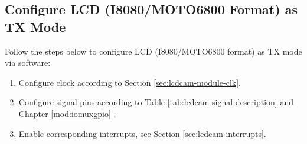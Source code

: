 \documentclass[main\_\_EN.tex]{subfiles}
\begin{document}
\subsection{Configure LCD (I8080/MOTO6800 Format) as TX Mode}

Follow the steps below to configure LCD (I8080/MOTO6800 format) as TX mode via software:

\begin{enumerate}
    \item Configure clock according to Section \ref{sec:lcdcam-module-clk}.

    \item Configure signal pins according to Table \ref{tab:lcdcam-signal-description} and Chapter \ref{mod:iomuxgpio} \textit{}.

    \item \label{LCDCAM-TX-INTERRUPT}Enable corresponding interrupts, see Section \ref{sec:lcdcam-interrupts}.


\end{enumerate}
\end{document}
